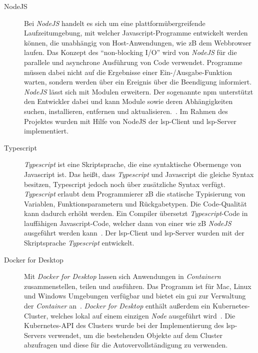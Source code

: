 \begin{description}
      \item[NodeJS]
            Bei \textit{NodeJS} handelt es sich um eine plattformübergreifende Laufzeitumgebung, mit welcher Javascript-Programme entwickelt werden können,
            die unabhängig von Host-Anwendungen, wie \ac{zB} dem Webbrowser laufen.
            Das Konzept des ``non-blocking I/O'' wird von \textit{NodeJS} für die parallele und asynchrone Ausführung von Code verwendet.
            Programme müssen dabei nicht auf die Ergebnisse einer Ein-/Ausgabe-Funktion warten,
            sondern werden über ein Ereignis über die Beendigung informiert.
            \textit{NodeJS} lässt sich mit Modulen erweitern.
            Der sogenannte \ac{npm} unterstützt den Entwickler dabei und kann Module sowie deren Abhängigkeiten suchen,
            installieren, entfernen und aktualisieren.~\cite{node-js-dev-insider,node-js-about}.
            Im Rahmen des Projektes wurden mit Hilfe von NodeJS der \ac{lsp}-Client und \ac{lsp}-Server implementiert.
      \item[Typescript]
            \textit{Typescript} ist eine Skriptsprache, die eine syntaktische Obermenge von Javascript ist. Das heißt, dass \textit{Typescript} und Javascript
            die gleiche Syntax besitzen, Typescript jedoch noch über zusätzliche Syntax verfügt.
            \textit{Typescript} erlaubt dem Programmierer \ac{zB} die statische Typisierung von Variablen, Funktionsparametern und Rückgabetypen.
            Die Code-Qualität kann dadurch erhöht werden. Ein Compiler übersetzt \textit{Typescript}-Code in lauffähigen Javascript-Code, welcher dann von einer
            wie \ac{zB} \textit{NodeJS} ausgeführt werden kann~\cite{typescript-kinsta,typescript-doubleslash-blog}.
            Der \ac{lsp}-Client und \ac{lsp}-Server wurden mit der Skriptsprache \textit{Typescript} entwickelt.
      \item[Docker for Desktop]
            Mit \textit{Docker for Desktop} lassen sich Anwendungen in \textit{Containern} zusammenstellen, teilen und ausführen.
            Das Programm ist für Mac, Linux und Windows Umgebungen verfügbar und bietet ein \ac{gui} zur Verwaltung der \textit{Container} an~\cite{docker-for-desktop-overview}.
            \textit{Docker for Desktop} enthält außerdem ein Kubernetes-Cluster, welches lokal auf einem einzigen \textit{Node} ausgeführt wird~\cite{docker-for-desktop-kubernetes}.
            Die Kubernetes-API des Clusters wurde bei der Implementierung des \ac{lsp}-Servers verwendet, um
            die bestehenden Objekte auf dem Cluster abzufragen und diese für die Autovervollständigung zu verwenden.

\end{description}
